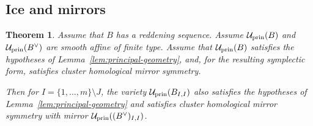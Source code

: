 \documentclass[12pt, letter]{amsart}
\newtheorem{theorem}{Theorem}[section]
\theoremstyle{definition}
\newcommand{\pr}{\mathrm{prin}}
\numberwithin{equation}{section}
\begin{document}
\subsection{Ice and mirrors}

\begin{theorem}\label{thm:freezing}
Assume that $B$ has a reddening sequence.
Assume
$\cU_{\pr}(B)$ and $\cU_{\pr}(B^\vee)$ are smooth affine of finite type.
Assume that $\cU_{\pr}(B)$ satisfies the hypotheses of
Lemma~\ref{lem:principal-geometry}, and, for the resulting symplectic form, satisfies cluster homological mirror symmetry.

Then for $I=\{1,\ldots,m\}\setminus J$, the variety
$\cU_{\pr}(B_{I,I})$ also satisfies the hypotheses of Lemma~\ref{lem:principal-geometry} and satisfies
cluster homological mirror symmetry with mirror 
$\cU_{\pr}((B^\vee)_{I,I})$.
\end{theorem}
\end{document}
